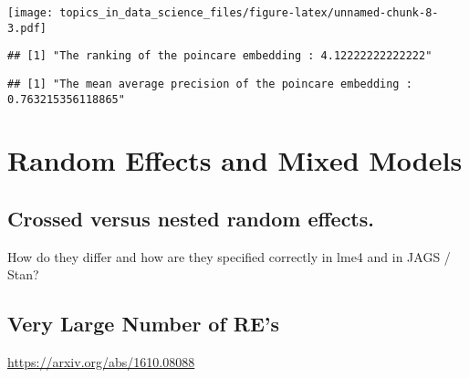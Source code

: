 \documentclass[
  11pt,
]{book}
\newenvironment{Shaded}{\begin{snugshade}}{\end{snugshade}}
\newcommand{\KeywordTok}[1]{\textcolor[rgb]{0.13,0.29,0.53}{\textbf{#1}}}
\newcommand{\NormalTok}[1]{#1}
\newcommand{\OperatorTok}[1]{\textcolor[rgb]{0.81,0.36,0.00}{\textbf{#1}}}
\newcommand{\StringTok}[1]{\textcolor[rgb]{0.31,0.60,0.02}{#1}}
\begin{document}
\texttt{[image: topics\_in\_data\_science\_files/figure-latex/unnamed-chunk-8-3.pdf]}

\begin{Shaded}
\end{Shaded}

\begin{verbatim}
## [1] "The ranking of the poincare embedding : 4.12222222222222"
\end{verbatim}

\begin{Shaded}
\end{Shaded}

\begin{verbatim}
## [1] "The mean average precision of the poincare embedding : 0.763215356118865"
\end{verbatim}

\hypertarget{random-effects-and-mixed-models}{%
\chapter{Random Effects and Mixed Models}\label{random-effects-and-mixed-models}}

\hypertarget{crossed-versus-nested-random-effects.}{%
\section{Crossed versus nested random effects.}\label{crossed-versus-nested-random-effects.}}

How do they differ and how are they specified correctly in lme4 and in JAGS / Stan?

\hypertarget{very-large-number-of-res}{%
\section{Very Large Number of RE's}\label{very-large-number-of-res}}

\url{https://arxiv.org/abs/1610.08088}
\end{document}
